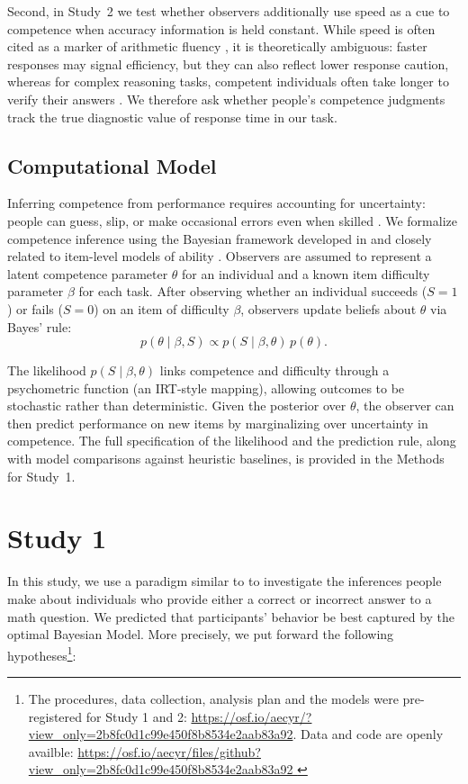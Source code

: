 \documentclass[10pt,letterpaper]{article}
\begin{document}
Second, in Study~2 we test whether observers additionally use speed as a cue to competence when accuracy information is held constant. While speed is often cited as a marker of arithmetic fluency \citep{Roy-2025,Cheng-2021}, it is theoretically ambiguous: faster responses may signal efficiency, but they can also reflect lower response caution, whereas for complex reasoning tasks, competent individuals often take longer to verify their answers \citep{Goldhammer-2011,Hedge-2018,Richardson-2022,Berke-2023}. We therefore ask whether people’s competence judgments track the true diagnostic value of response time in our task.

\subsection{Computational Model}\label{computational-model}

Inferring competence from performance requires accounting for uncertainty: people can guess, slip, or make occasional errors even when skilled \citep{Jones-1989}. We formalize competence inference using the Bayesian framework developed in \citet{Mercier-2025c} and closely related to item-level models of ability \citep{Jansen-2021}. Observers are assumed to represent a latent competence parameter $\theta$ for an individual and a known item difficulty parameter $\beta$ for each task. After observing whether an individual succeeds ($S=1$) or fails ($S=0$) on an item of difficulty $\beta$, observers update beliefs about $\theta$ via Bayes’ rule:
\begin{equation}
p(\theta \mid \beta, S) \propto p(S \mid \beta, \theta)\, p(\theta).
\label{eq:bayes}
\end{equation}

The likelihood $p(S \mid \beta, \theta)$ links competence and difficulty through a psychometric function (an IRT-style mapping), allowing outcomes to be stochastic rather than deterministic. Given the posterior over $\theta$, the observer can then predict performance on new items by marginalizing over uncertainty in competence. The full specification of the likelihood and the prediction rule, along with model comparisons against heuristic baselines, is provided in the Methods for Study~1.

\section{Study 1}\label{study-1}

In this study, we use a paradigm similar to \citet{Mercier-2025c} to investigate the inferences people make about individuals who provide either a correct or incorrect answer to a math question. We predicted that participants' behavior be best captured by the optimal Bayesian Model. More precisely, we put forward the following hypotheses\footnote{The procedures, data collection, analysis plan and the models were pre-registered for Study 1 and 2: \url{https://osf.io/aecyr/?view_only=2b8fc0d1c99e450f8b8534e2aab83a92}. Data and code are openly availble: \url{https://osf.io/aecyr/files/github?view_only=2b8fc0d1c99e450f8b8534e2aab83a92 }}:
\end{document}
